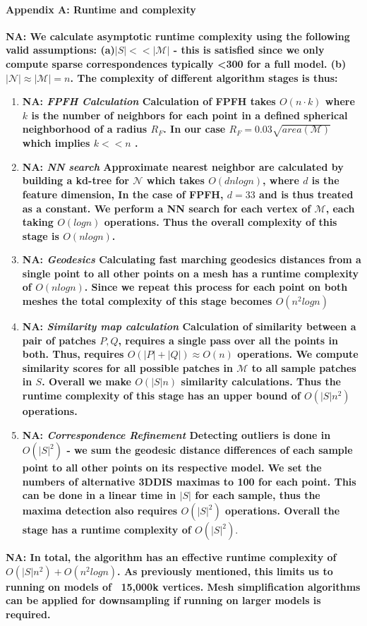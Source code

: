 \documentclass[10pt,twocolumn,letterpaper]{article}
\newcommand{\colornote}[3]{{\color{#1}\bf{#2: #3}\normalfont}}
\newcommand{\colornote}[3]{}
\newcommand {\nadav}[1]{\colornote{red}{NA}{#1}}
\begin{document}
\paragraph{Appendix A: Runtime and complexity}
\label{app:Runtime}
\nadav{
	We calculate asymptotic runtime complexity using the following valid assumptions:
	(a)$|S|<<|\mathcal{M}|$ - this is satisfied since we only compute sparse correspondences typically <300 for a full model. 
	(b) $|\mathcal{N}|\approx |\mathcal{M}|=n$. 
	The complexity of different algorithm stages is thus:
}
\begin{enumerate}
	
	\item \nadav{\textit{FPFH Calculation} Calculation of FPFH takes $O(n \cdot k)$ where $k$ is the number of neighbors for each point in a defined spherical neighborhood of a radius $R_F$. In our case $R_F=0.03\sqrt{area(\mathcal{M})}$ which implies $k << n$ .
	}
	
	\item \nadav{\textit{NN search} Approximate nearest neighbor are calculated by building a kd-tree for $\mathcal{N}$ which takes $O(dnlogn)$, where $d$ is the feature dimension,
		In the case of FPFH, $d=33$ and is thus treated as a constant. 
		We perform a NN search for each vertex of $\mathcal{M}$, each taking $O(logn)$ operations. 
		Thus the overall complexity of this stage is $O(nlogn)$.}
	
	\item \nadav{\textit{Geodesics} Calculating fast marching geodesics distances from a single point to all other points on a mesh has a runtime complexity of $O(nlogn)$.
		Since we repeat this process for each point on both meshes the total complexity of this stage becomes $O(n^2logn)$}
	
	\item \nadav{\textit{Similarity map calculation} Calculation of similarity between a pair of patches $P,Q$, requires a single pass over all the points in both. 
		Thus, requires $O(|P|+|Q|)\approx O(n)$ operations. 
		We compute  similarity scores for all possible patches in $\mathcal{M}$ to all sample patches in $S$. 
		Overall we make $O(|S|n)$ similarity calculations. 
		Thus the runtime complexity of this stage has an upper bound of $O(|S|n^2)$ operations.}
	
	\item \nadav{\textit{Correspondence Refinement} 
		Detecting outliers is done in $O(|S|^2)$ - we sum the geodesic distance differences of each sample point to all other points on its respective model. 
		We set the numbers of alternative 3DDIS maximas to 100 for each point. This can be done in a linear time in $|S|$ for each sample, thus the maxima detection also requires $O(|S|^2)$ operations.
		Overall the stage has a runtime complexity of $O(|S|^2)$}.
	
\end{enumerate}
\nadav{In total, the algorithm has an effective runtime complexity of $O(|S|n^2) + O(n^2logn)$.
	As previously mentioned, this limits us to running on models of ~15,000k vertices. 
	Mesh simplification algorithms can be applied for downsampling if running on larger models is required.}
\end{document}
